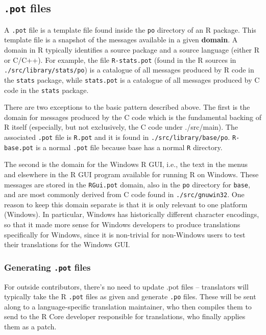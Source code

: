 \documentclass[
]{book}
\begin{document}
\hypertarget{pot-files}{%
\subsection{\texorpdfstring{\texttt{.pot} files}{.pot files}}\label{pot-files}}

A \texttt{.pot} file is a template file found inside the \texttt{po} directory of an R package.
This template file is a snapshot of the messages available in a given \textbf{domain}. A domain in R typically identifies
a source package and a source language (either R or C/C++). For example, the file \texttt{R-stats.pot}
(found in the R sources in \texttt{./src/library/stats/po}) is a catalogue of all messages produced by R code in the
\texttt{stats} package, while \texttt{stats.pot} is a catalogue of all messages produced by C code in the \texttt{stats} package.

There are two exceptions to the basic pattern described above. The first is the domain for messages produced by
the C code which is the fundamental backing of R itself (especially, but not exclusively, the C code under
./src/main). The associated \texttt{.pot} file is \texttt{R.pot} and it is found in \texttt{./src/library/base/po}. \texttt{R-base.pot} is a
normal \texttt{.pot} file because base has a normal \texttt{R} directory.

The second is the domain for the Windows R GUI, i.e., the text in the menus and elsewhere in the R GUI program
available for running R on Windows. These messages are stored in the \texttt{RGui.pot} domain, also in the \texttt{po}
directory for \texttt{base}, and are most commonly derived from C code found in \texttt{./src/gnuwin32}. One reason to keep
this domain separate is that it is only relevant to one platform (Windows). In particular, Windows has historically
different character encodings, so that it made more sense for Windows developers to produce translations specifically for Windows, since it is non-trivial for non-Windows users to test their translations for the Windows GUI.

\hypertarget{generating-.pot-files}{%
\subsubsection{\texorpdfstring{Generating \texttt{.pot} files}{Generating .pot files}}\label{generating-.pot-files}}

For outside contributors, there's no need to update .pot files -- translators will typically take the R \texttt{.pot} files
as given and generate \texttt{.po} files. These will be sent along to a language-specific translation maintainer, who then
compiles them to send to the R Core developer responsible for translations, who finally applies them as a patch.
\end{document}
